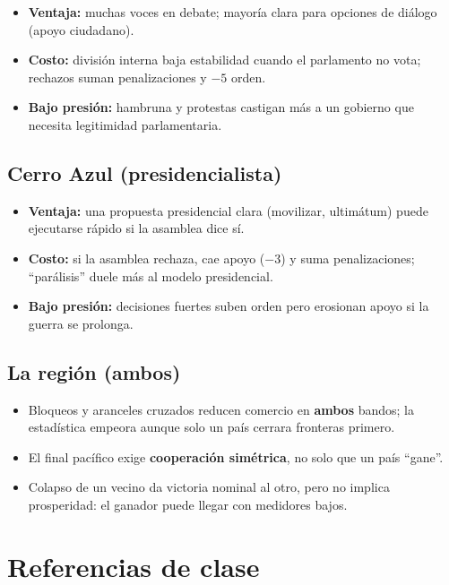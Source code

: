 \documentclass[11pt,a4paper]{article}
\begin{document}
\begin{itemize}
  \item \textbf{Ventaja:} muchas voces en debate; mayoría clara para opciones de diálogo (apoyo ciudadano).
  \item \textbf{Costo:} división interna baja estabilidad cuando el parlamento no vota; rechazos suman penalizaciones y $-5$ orden.
  \item \textbf{Bajo presión:} hambruna y protestas castigan más a un gobierno que necesita legitimidad parlamentaria.
\end{itemize}

\subsection{Cerro Azul (presidencialista)}

\begin{itemize}
  \item \textbf{Ventaja:} una propuesta presidencial clara (movilizar, ultimátum) puede ejecutarse rápido si la asamblea dice sí.
  \item \textbf{Costo:} si la asamblea rechaza, cae apoyo ($-3$) y suma penalizaciones; ``parálisis'' duele más al modelo presidencial.
  \item \textbf{Bajo presión:} decisiones fuertes suben orden pero erosionan apoyo si la guerra se prolonga.
\end{itemize}

\subsection{La región (ambos)}

\begin{itemize}
  \item Bloqueos y aranceles cruzados reducen comercio en \textbf{ambos} bandos; la estadística empeora aunque solo un país cerrara fronteras primero.
  \item El final pacífico exige \textbf{cooperación simétrica}, no solo que un país ``gane''.
  \item Colapso de un vecino da victoria nominal al otro, pero no implica prosperidad: el ganador puede llegar con medidores bajos.
\end{itemize}

\section{Referencias de clase}
\end{document}
